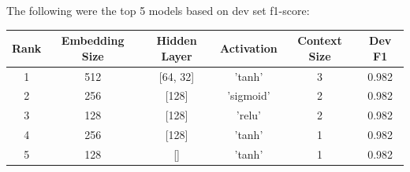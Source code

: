 \documentclass[a4paper,9pt]{report}
\begin{document}
The following were the top 5 models based on dev set f1-score:
\begin{table}[H]
    \centering
    \begin{tabular}{|c|c|c|c|c|c|}
        \hline
        \textbf{Rank} & \textbf{Embedding Size} & \textbf{Hidden Layer} & \textbf{Activation} & \textbf{Context Size} & \textbf{Dev F1} \\
        \hline
        1 & 512 & [64, 32] & 'tanh' & 3 & 0.982 \\
        \hline                                            
        2  & 256 & [128] & 'sigmoid' & 2 & 0.982 \\
        \hline
        3 & 128 & [128] & 'relu' & 2 & 0.982 \\
        \hline
        4 & 256 & [128] & 'tanh' & 1 & 0.982 \\
        \hline        
        5 & 128 & [] & 'tanh' & 1 & 0.982 \\
        \hline
    \end{tabular}
\end{table}
\end{document}
